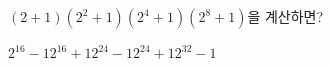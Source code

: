 $(2+1)(2^2+1)(2^4+1)(2^8+1)$을 계산하면?
\begin{choices32}{$2^{16}-1$}{$2^{16}+1$}{$2^{24}-1$}{$2^{24}+1$}{$2^{32}-1$}\end{choices32}
